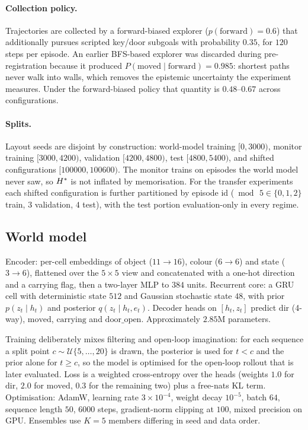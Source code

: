 \paragraph{Collection policy.} Trajectories are collected by a forward-biased explorer
($p(\text{forward}) = 0.6$) that additionally pursues scripted key/door subgoals with
probability $0.35$, for $120$ steps per episode. An earlier BFS-based explorer was discarded
during pre-registration because it produced $P(\text{moved} \mid \text{forward}) = 0.985$:
shortest paths never walk into walls, which removes the epistemic uncertainty the experiment
measures. Under the forward-biased policy that quantity is $0.48$--$0.67$ across
configurations.

\paragraph{Splits.} Layout seeds are disjoint by construction: world-model training
$[0,3000)$, monitor training $[3000,4200)$, validation $[4200,4800)$, test $[4800,5400)$, and
shifted configurations $[100000,100600)$. The monitor trains on episodes the world model never
saw, so $H^{*}$ is not inflated by memorisation. For the transfer experiments each shifted
configuration is further partitioned by episode id ($\bmod\,5 \in \{0,1,2\}$ train, $3$
validation, $4$ test), with the test portion evaluation-only in every regime.

\subsection{World model}

Encoder: per-cell embeddings of object ($11 \to 16$), colour ($6 \to 6$) and state
($3 \to 6$), flattened over the $5\times5$ view and concatenated with a one-hot direction and a
carrying flag, then a two-layer MLP to $384$ units. Recurrent core: a GRU cell
\citep{cho2014gru} with deterministic state $512$ and Gaussian stochastic state $48$, with
prior $p(z_t \mid h_t)$ and posterior $q(z_t \mid h_t, e_t)$. Decoder heads on $[h_t, z_t]$
predict $\mathrm{dir}$ (4-way), $\mathrm{moved}$, $\mathrm{carrying}$ and
$\mathrm{door\_open}$. Approximately $2.85$M parameters.

Training deliberately mixes filtering and open-loop imagination: for each sequence a split
point $c \sim \mathcal{U}\{5,\dots,20\}$ is drawn, the posterior is used for $t < c$ and the
prior alone for $t \ge c$, so the model is optimised for the open-loop rollout that is later
evaluated. Loss is a weighted cross-entropy over the heads (weights $1.0$ for $\mathrm{dir}$,
$2.0$ for $\mathrm{moved}$, $0.3$ for the remaining two) plus a free-nats KL term.
Optimisation: AdamW, learning rate $3\times10^{-4}$, weight decay $10^{-5}$, batch $64$,
sequence length $50$, $6000$ steps, gradient-norm clipping at $100$, mixed precision on GPU.
Ensembles use $K=5$ members differing in seed and data order.

